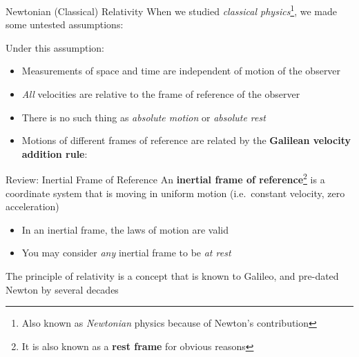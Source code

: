 \documentclass[12pt,compress,aspectratio=169]{beamer}
\begin{document}
\begin{frame}{Newtonian (Classical) Relativity}
  When we studied \emph{classical physics}\footnote{Also known as
    \emph{Newtonian} physics because of Newton's contribution}, we made some
  untested assumptions:
  Under this assumption:
  \begin{itemize}
  \item Measurements of space and time are independent of motion of the
    observer
  \item\emph{All} velocities are relative to the frame of reference of the
    observer
  \item There is no such thing as \emph{absolute motion} or \emph{absolute rest}
  \item Motions of different frames of reference are related by the
    \textbf{Galilean velocity addition rule}:

  \end{itemize}
\end{frame}



\begin{frame}{Review: Inertial Frame of Reference}
  An \textbf{inertial frame of reference}\footnote{It is also known as a
  \textbf{rest frame} for obvious reasons} is a coordinate system that is
  moving in uniform motion (i.e.\ constant velocity, zero acceleration)
  \begin{itemize}  \item In an inertial frame, the laws of motion are valid
  \item %
    You may consider \emph{any} inertial frame to be \emph{at rest}
  \end{itemize}
  \vspace{.1in}
  \begin{center}
  \end{center}
  The principle of relativity is a concept that is known to Galileo, and
  pre-dated Newton by several decades
\end{frame}
\end{document}
